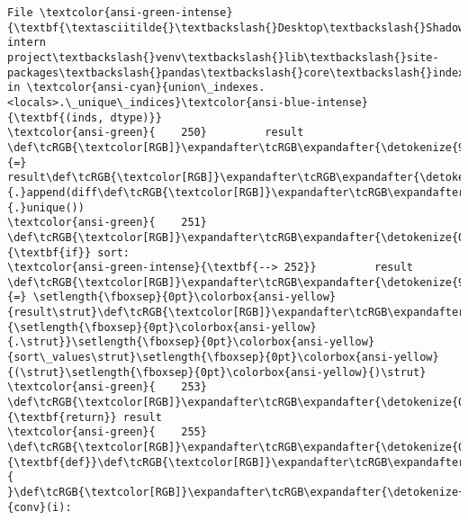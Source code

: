 \documentclass[11pt]{article}
\begin{document}
\begin{Verbatim}[commandchars=\\\{\}, frame=single, framerule=2mm, rulecolor=\color{outerrorbackground}]
File \textcolor{ansi-green-intense}{\textbf{\textasciitilde{}\textbackslash{}Desktop\textbackslash{}Shadowfox intern project\textbackslash{}venv\textbackslash{}lib\textbackslash{}site-packages\textbackslash{}pandas\textbackslash{}core\textbackslash{}indexes\textbackslash{}api.py:252}}, in \textcolor{ansi-cyan}{union\_indexes.<locals>.\_unique\_indices}\textcolor{ansi-blue-intense}{\textbf{(inds, dtype)}}
\textcolor{ansi-green}{    250}         result \def\tcRGB{\textcolor[RGB]}\expandafter\tcRGB\expandafter{\detokenize{98,98,98}}{=} result\def\tcRGB{\textcolor[RGB]}\expandafter\tcRGB\expandafter{\detokenize{98,98,98}}{.}append(diff\def\tcRGB{\textcolor[RGB]}\expandafter\tcRGB\expandafter{\detokenize{98,98,98}}{.}unique())
\textcolor{ansi-green}{    251}     \def\tcRGB{\textcolor[RGB]}\expandafter\tcRGB\expandafter{\detokenize{0,135,0}}{\textbf{if}} sort:
\textcolor{ansi-green-intense}{\textbf{--> 252}}         result \def\tcRGB{\textcolor[RGB]}\expandafter\tcRGB\expandafter{\detokenize{98,98,98}}{=} \setlength{\fboxsep}{0pt}\colorbox{ansi-yellow}{result\strut}\def\tcRGB{\textcolor[RGB]}\expandafter\tcRGB\expandafter{\detokenize{98,98,98}}{\setlength{\fboxsep}{0pt}\colorbox{ansi-yellow}{.\strut}}\setlength{\fboxsep}{0pt}\colorbox{ansi-yellow}{sort\_values\strut}\setlength{\fboxsep}{0pt}\colorbox{ansi-yellow}{(\strut}\setlength{\fboxsep}{0pt}\colorbox{ansi-yellow}{)\strut}
\textcolor{ansi-green}{    253}     \def\tcRGB{\textcolor[RGB]}\expandafter\tcRGB\expandafter{\detokenize{0,135,0}}{\textbf{return}} result
\textcolor{ansi-green}{    255} \def\tcRGB{\textcolor[RGB]}\expandafter\tcRGB\expandafter{\detokenize{0,135,0}}{\textbf{def}}\def\tcRGB{\textcolor[RGB]}\expandafter\tcRGB\expandafter{\detokenize{188,188,188}}{ }\def\tcRGB{\textcolor[RGB]}\expandafter\tcRGB\expandafter{\detokenize{0,0,255}}{conv}(i):


\end{Verbatim}
\end{document}
